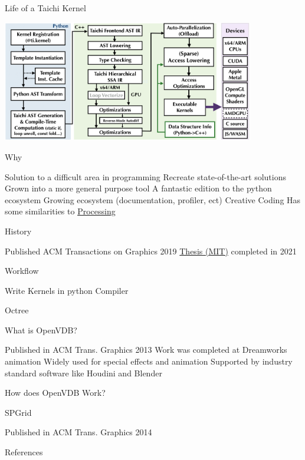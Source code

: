 \documentclass{beamer}
\begin{document}
\begin{frame}{Life of a Taichi Kernel}
  \begin{centering}
    \includegraphics[width=11cm]{life_of_a_taichi_kernel.png}
  \end{centering}
\end{frame}

\begin{frame}{Why}
  \begin{outline}
    \1 Solution to a difficult area in programming 
      \2 Recreate state-of-the-art solutions 
    \1 Grown into a more general purpose tool
      \2 A fantastic edition to the python ecosystem 
      \2 Growing ecosystem (documentation, profiler, ect)
    \1 Creative Coding
      \2 Has some similarities to \href{https://processing.org}{Processing}
  \end{outline}
\end{frame}

\begin{frame}{History}
  \begin{outline}
    \1 Published ACM Transactions on Graphics 2019 \cite{Hu2019}
    \1 \href{https://yuanming.taichi.graphics/publication/2021-taichi-thesis/}{Thesis (MIT)} 
    completed in 2021
  \end{outline}
\end{frame}

\begin{frame}{Workflow}
  \begin{outline}
    \1 Write Kernels in python
    \2 Compiler 
  \end{outline}
\end{frame}

\begin{frame}{Octree}

\end{frame}

\begin{frame}{What is OpenVDB?}
  \begin{outline}
    \1 Published in ACM Trans. Graphics 2013 \cite{Museth2013}
    \1 Work was completed at Dreamworks animation
    \1 Widely used for special effects and animation
      \2 Supported by industry standard software like Houdini and Blender
  \end{outline}
\end{frame}

\begin{frame}{How does OpenVDB Work?}

\end{frame}

\begin{frame}{SPGrid}
  \begin{outline}
    \1 Published in ACM Trans. Graphics 2014 \cite{Setaluri2014}
  \end{outline}
\end{frame}

\begin{frame}[allowframebreaks]{References}
\tiny
\printbibliography
\end{frame}
\end{document}
